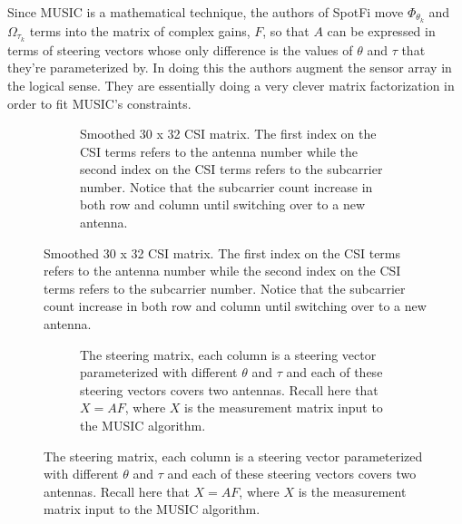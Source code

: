 \documentclass[12pt]{report}
\begin{document}

Since MUSIC is a mathematical technique, the authors of SpotFi move $\Phi_{\theta_k}$ and $\Omega_{\tau_k}$ terms into the matrix of complex gains, $F$, so that $A$ can be expressed in terms of steering vectors whose only difference is the values of $\theta$ and $\tau$ that they're parameterized by. In doing this the authors augment the sensor array in the logical sense. They are essentially doing a very clever matrix factorization in order to fit MUSIC's constraints. \par

\begin{figure}%
    \begin{center}
        \caption{The smoothed CSI matrix constructed in SpotFi and the matrices $A$ and $F$ which are specifically constructed to be compatible with MUSIC.}
        \label{figure: spotfi-smoothing-explained}
        \begin{subfigure}[b]{0.85\textwidth}
            \caption{Smoothed 30 x 32 CSI matrix. The first index on the CSI terms refers to the antenna number while the second index on the CSI terms refers to the subcarrier number. Notice that the subcarrier count increase in both row and column until switching over to a new antenna.}
            \label{subfigure: smoothed-csi-matrix}
            \centerline{\scalebox{0.95}{}}
        \end{subfigure}
    \end{center}
\end{figure}
\begin{figure}%
    \begin{center}
        \ContinuedFloat
        \par\bigskip
        \begin{subfigure}[h]{0.85\textwidth}
            \caption{The steering matrix, each column is a steering vector parameterized with different $\theta$ and $\tau$ and each of these steering vectors covers two antennas. Recall here that $X = AF$, where $X$ is the measurement matrix input to the MUSIC algorithm.}
            \label{subfigure: steering-matrix}
            \centerline{\scalebox{0.6}{}}
        \end{subfigure}
    \end{center}
\end{figure}
\end{document}
